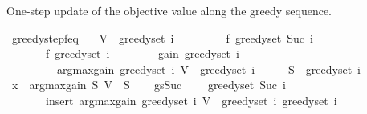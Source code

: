 \begin{isabellebody}
\begin{isamarkuptext}
One-step update of the objective value along the greedy sequence.%
\end{isamarkuptext}\isamarkuptrue%
\isamarkupfalse%
\ greedy{\isacharunderscore}{\kern0pt}step{\isacharunderscore}{\kern0pt}f{\isacharunderscore}{\kern0pt}eq{\isacharcolon}{\kern0pt}\isanewline
\ \ \ {\isachardoublequoteopen}V\ {\isacharminus}{\kern0pt}\ greedy{\isacharunderscore}{\kern0pt}set\ i\ {\isasymnoteq}\ {\isacharbraceleft}{\kern0pt}{\isacharbraceright}{\kern0pt}{\isachardoublequoteclose}\isanewline
\ \ \isanewline
\ \ \ \ {\isachardoublequoteopen}f\ {\isacharparenleft}{\kern0pt}greedy{\isacharunderscore}{\kern0pt}set\ {\isacharparenleft}{\kern0pt}Suc\ i{\isacharparenright}{\kern0pt}{\isacharparenright}{\kern0pt}\ {\isacharequal}{\kern0pt}\isanewline
\ \ \ \ \ \ \ f\ {\isacharparenleft}{\kern0pt}greedy{\isacharunderscore}{\kern0pt}set\ i{\isacharparenright}{\kern0pt}\ {\isacharplus}{\kern0pt}\isanewline
\ \ \ \ \ \ \ gain\ {\isacharparenleft}{\kern0pt}greedy{\isacharunderscore}{\kern0pt}set\ i{\isacharparenright}{\kern0pt}\isanewline
\ \ \ \ \ \ \ \ \ {\isacharparenleft}{\kern0pt}argmax{\isacharunderscore}{\kern0pt}gain\ {\isacharparenleft}{\kern0pt}greedy{\isacharunderscore}{\kern0pt}set\ i{\isacharparenright}{\kern0pt}\ {\isacharparenleft}{\kern0pt}V\ {\isacharminus}{\kern0pt}\ greedy{\isacharunderscore}{\kern0pt}set\ i{\isacharparenright}{\kern0pt}{\isacharparenright}{\kern0pt}{\isachardoublequoteclose}\isanewline
%
\isadelimproof
%
\endisadelimproof
%
\isatagproof
{}\isamarkupfalse%
\ {\isacharminus}{\kern0pt}\isanewline
\ \ \isamarkupfalse%
\ {\isacharquery}{\kern0pt}S\ {\isacharequal}{\kern0pt}\ {\isachardoublequoteopen}greedy{\isacharunderscore}{\kern0pt}set\ i{\isachardoublequoteclose}\isanewline
\ \ \isamarkupfalse%
\ {\isacharquery}{\kern0pt}x\ {\isacharequal}{\kern0pt}\ {\isachardoublequoteopen}argmax{\isacharunderscore}{\kern0pt}gain\ {\isacharquery}{\kern0pt}S\ {\isacharparenleft}{\kern0pt}V\ {\isacharminus}{\kern0pt}\ {\isacharquery}{\kern0pt}S{\isacharparenright}{\kern0pt}{\isachardoublequoteclose}\isanewline
\isanewline
\ \ \isamarkupfalse%
\ gs{\isacharunderscore}{\kern0pt}Suc{\isacharcolon}{\kern0pt}\isanewline
\ \ \ \ {\isachardoublequoteopen}greedy{\isacharunderscore}{\kern0pt}set\ {\isacharparenleft}{\kern0pt}Suc\ i{\isacharparenright}{\kern0pt}\ {\isacharequal}{\kern0pt}\isanewline
\ \ \ \ \ \ \ insert\ {\isacharparenleft}{\kern0pt}argmax{\isacharunderscore}{\kern0pt}gain\ {\isacharparenleft}{\kern0pt}greedy{\isacharunderscore}{\kern0pt}set\ i{\isacharparenright}{\kern0pt}\ {\isacharparenleft}{\kern0pt}V\ {\isacharminus}{\kern0pt}\ greedy{\isacharunderscore}{\kern0pt}set\ i{\isacharparenright}{\kern0pt}{\isacharparenright}{\kern0pt}\ {\isacharparenleft}{\kern0pt}greedy{\isacharunderscore}{\kern0pt}set\ i{\isacharparenright}{\kern0pt}{\isachardoublequoteclose}\isanewline

\end{isabellebody}
